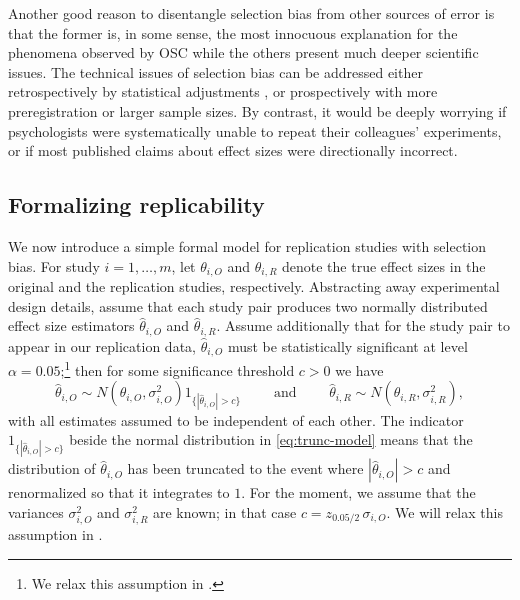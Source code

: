\documentclass[11pt]{article}
\theoremstyle{definition}
\theoremstyle{custom}
\newcommand{\htheta}{\hat{\theta}}
\begin{document}
  Another good reason to disentangle selection bias from other sources of error is that the former is, in some sense, the most innocuous explanation for the phenomena observed by OSC while the others present much deeper scientific issues. The technical issues of selection bias can be addressed either retrospectively by statistical adjustments \citep[e.g.][]{Duval:2000dg,Hedges:1992eb,Simonsohn:2014ch,Fithian:2014ws,Andrews:2018vh}, or prospectively with more preregistration or larger sample sizes. By contrast, it would be deeply worrying if psychologists were systematically unable to repeat their colleagues' experiments, or if most published claims about effect sizes were directionally incorrect.
  
\subsection{Formalizing replicability}

  We now introduce a simple formal model for replication studies with selection bias. For study $i=1, \ldots, m$, let $\theta_{i,O}$ and $\theta_{i,R}$ denote the true effect sizes in the original and the replication studies, respectively. Abstracting away experimental design details, assume that each study pair produces two normally distributed effect size estimators $\htheta_{i,O}$ and $\htheta_{i,R}$. Assume additionally that for the study pair to appear in our replication data, $\htheta_{i,O}$ must be statistically significant at level $\alpha=0.05$;\footnote{We relax this assumption in .} then for some significance threshold $c>0$ we have
  \begin{equation}
    \htheta_{i,O} \sim N\left(\theta_{i,O}, \sigma_{i,O}^2\right) 1_{\{|\htheta_{i,O}| > c\}} \qquad\text{ and }\qquad \htheta_{i,R} \sim N\left(\theta_{i,R}, \sigma_{i,R}^2\right),
  \label{eq:trunc-model}
  \end{equation}
  with all estimates assumed to be independent of each other. The indicator $1_{\{|\htheta_{i,O}| > c\}}$ beside the normal distribution in \eqref{eq:trunc-model} means that the distribution of $\htheta_{i,O}$ has been truncated to the event where $|\htheta_{i,O}|>c$ and renormalized so that it integrates to $1$. For the moment, we assume that the variances $\sigma_{i,O}^2$ and $\sigma_{i,R}^2$ are known; in that case $c = z_{0.05 / 2}\, \sigma_{i,O}$. We will relax this assumption in .
\end{document}

